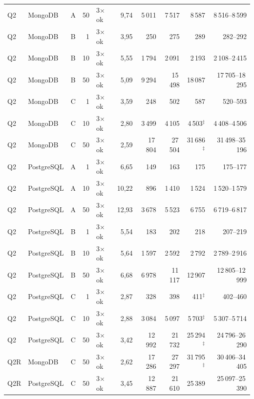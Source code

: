 \begin{longtable}{llcrlrrrrr}
Q2 & MongoDB & A & 50 & 3$\times$ok & 9{,}74 & 5\,011 & 7\,517 & 8\,587 & 8\,516--8\,599 \\
Q2 & MongoDB & B & 1 & 3$\times$ok & 3{,}95 & 250 & 275 & 289 & 282--292 \\
Q2 & MongoDB & B & 10 & 3$\times$ok & 5{,}55 & 1\,794 & 2\,091 & 2\,193 & 2\,108--2\,415 \\
Q2 & MongoDB & B & 50 & 3$\times$ok & 5{,}09 & 9\,294 & 15\,498 & 18\,087 & 17\,705--18\,295 \\
Q2 & MongoDB & C & 1 & 3$\times$ok & 3{,}59 & 248 & 502 & 587 & 520--593 \\
Q2 & MongoDB & C & 10 & 3$\times$ok & 2{,}80 & 3\,499 & 4\,105 & 4\,503$^{\ddagger}$ & 4\,408--4\,506 \\
Q2 & MongoDB & C & 50 & 3$\times$ok & 2{,}59 & 17\,804 & 27\,504 & 31\,686$^{\ddagger}$ & 31\,498--35\,196 \\
\addlinespace
Q2 & PostgreSQL & A & 1 & 3$\times$ok & 6{,}65 & 149 & 163 & 175 & 175--177 \\
Q2 & PostgreSQL & A & 10 & 3$\times$ok & 10{,}22 & 896 & 1\,410 & 1\,524 & 1\,520--1\,579 \\
Q2 & PostgreSQL & A & 50 & 3$\times$ok & 12{,}93 & 3\,678 & 5\,523 & 6\,755 & 6\,719--6\,817 \\
Q2 & PostgreSQL & B & 1 & 3$\times$ok & 5{,}54 & 183 & 202 & 218 & 207--219 \\
Q2 & PostgreSQL & B & 10 & 3$\times$ok & 5{,}64 & 1\,597 & 2\,592 & 2\,792 & 2\,789--2\,916 \\
Q2 & PostgreSQL & B & 50 & 3$\times$ok & 6{,}68 & 6\,978 & 11\,117 & 12\,907 & 12\,805--12\,999 \\
Q2 & PostgreSQL & C & 1 & 3$\times$ok & 2{,}87 & 328 & 398 & 411$^{\ddagger}$ & 402--460 \\
Q2 & PostgreSQL & C & 10 & 3$\times$ok & 2{,}88 & 3\,084 & 5\,097 & 5\,703$^{\ddagger}$ & 5\,307--5\,714 \\
Q2 & PostgreSQL & C & 50 & 3$\times$ok & 3{,}42 & 12\,992 & 21\,732 & 25\,294$^{\ddagger}$ & 24\,796--26\,290 \\
\addlinespace
Q2R & MongoDB & C & 50 & 3$\times$ok & 2{,}62 & 17\,286 & 27\,297 & 31\,795$^{\ddagger}$ & 30\,406--34\,405 \\
\addlinespace
Q2R & PostgreSQL & C & 50 & 3$\times$ok & 3{,}45 & 12\,887 & 21\,610 & 25\,389 & 25\,097--25\,390 \\
\end{longtable}
